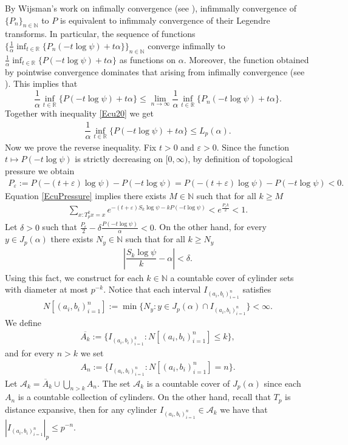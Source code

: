 \documentclass[11pt]{amsart}
\theoremstyle{remark}
\numberwithin{equation}{section}
\newcommand{\N}{\mathbb{N}}
\newcommand{\R}{\mathbb{R}}
\begin{document}
By Wijsman's work on infimally convergence (see \cite[Theorem 6.2]{wi2}), infimmally convergence of $\{P_{n}\}_{n\in \N}$ to $P$ is equivalent to infimmaly convergence of their Legendre transforms. In particular, the sequence of functions $\{\frac{1}{\alpha}\inf_{t\in \R}\{P_{n}(-t\log \psi)+t\alpha\}\}_{n\in \N}$ converge infimally to $\frac{1}{\alpha}\inf_{t\in \R}\{P(-t\log \psi)+t\alpha\}$ as functions on $\alpha$. Moreover, the function obtained by pointwise convergence dominates that arising from infimally convergence (see \cite[section 5]{wi2}). This implies that $$\dfrac{1}{\alpha}\inf_{t\in \R}\{P(-t\log \psi)+t\alpha\}\leq \lim_{n\rightarrow \infty}\dfrac{1}{\alpha}\inf_{t\in \R}\{P_{n}(-t\log \psi)+t\alpha\}.$$ Together with inequality \eqref{Ecu20} we get 
\begin{align}\label{AimFOR}
    \dfrac{1}{\alpha}\inf_{t\in \R}\{P(-t\log \psi)+t\alpha\}\leq L_{p}(\alpha).
\end{align} Now we prove the reverse inequality. Fix $t>0$ and $\varepsilon >0$. Since the function $t\mapsto P(-t\log \psi)$ is strictly decreasing on $[0,\infty)$, by definition of topological pressure we obtain
\begin{align*}
    P_{\varepsilon}:=P(-(t+\varepsilon)\log \psi)-P(-t\log\psi)=P(-(t+\varepsilon)\log\psi)-P(-t\log\psi)<0.
\end{align*} Equation \eqref{EcuPressure} implies there exists $M\in \N$ such that for all $k\geq M$
\begin{align*}
    \sum_{x:T^{k}_{p}x=x}e^{-(t+\varepsilon)S_{k}\log\psi-kP(-t\log\psi)}<e^{\frac{P_{\varepsilon}k}{2}}<1.
\end{align*}Let $\delta>0$ such that $\frac{P_{\varepsilon}}{2}-\delta\frac{P(-t\log\psi)}{\alpha}<0$. On the other hand, for every $y\in J_{p}(\alpha)$ there exists $N_{y}\in \N$ such that for all $k\geq N_{y}$
\begin{align*}
    \left|\dfrac{S_{k}\log \psi}{k}-\alpha\right|<\delta.
\end{align*}Using this fact, we construct for each $k\in \N$ a countable cover of cylinder sets with diameter at most $p^{-k}$. Notice that each interval $I_{(a_{i},b_{i})_{i=1}^{n}}$ satisfies
\begin{align*}
    N[(a_{i},b_{i})_{i=1}^{n}]:=\min\{N_{y}:y\in J_{p}(\alpha)\cap I_{(a_{i},b_{i})_{i=1}^{n}}\}<\infty.
\end{align*} We define 
\begin{align*}
    \overline{A_{k}}:=\{I_{(a_{i},b_{i})_{i=1}^{k}}:N[(a_{i},b_{i})_{i=1}^{n}]\leq k\},
\end{align*}and for every $n>k$ we set
\begin{align*}
    A_{n}:=\{I_{(a_{i},b_{i})_{i=1}^{n}}:N[(a_{i},b_{i})_{i=1}^{n}]=n\}.
\end{align*}Let $\mathcal{A}_{k}=\overline{A}_{k}\cup \bigcup_{n>k}A_{n}$. The set $\mathcal{A}_{k}$ is a countable cover of $J_{p}(\alpha)$ since each $A_{n}$ is a countable collection of cylinders. On the other hand, recall that $T_{p}$ is distance expansive, then for any cylinder $I_{(a_{i},b_{i})_{i=1}^{n}}\in \mathcal{A}_{k}$ we have that $|I_{(a_{i},b_{i})_{i=1}^{n}}|_{p}\leq p^{-n}$. 
\end{document}
